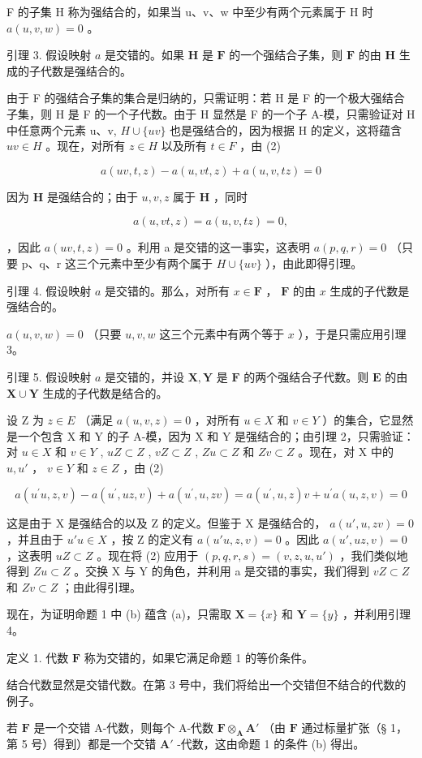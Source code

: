 F 的子集 H 称为强结合的，如果当 u、v、w 中至少有两个元素属于 H 时 \(a(u, v, w) = 0\) 。

引理 3. 假设映射 \(a\) 是交错的。如果 \(\mathbf{H}\) 是 \(\mathbf{F}\) 的一个强结合子集，则 \(\mathbf{F}\) 的由 \(\mathbf{H}\) 生成的子代数是强结合的。

由于 F 的强结合子集的集合是归纳的，只需证明：若 H 是 F 的一个极大强结合子集，则 H 是 F 的一个子代数。由于 H 显然是 F 的一个子 A-模，只需验证对 H 中任意两个元素 u、v, \(H \cup \{uv\}\) 也是强结合的，因为根据 H 的定义，这将蕴含 \(uv \in H\) 。现在，对所有 \(z \in H\) 以及所有 \(t \in F\) ，由 (2)

\[
a (u v, t, z) - a (u, v t, z) + a (u, v, t z) = 0
\]

因为 \(\mathbf{H}\) 是强结合的；由于 \(u, v, z\) 属于 \(\mathbf{H}\) ，同时

\[
a (u, v t, z) = a (u, v, t z) = 0,
\]

，因此 \(a(uv, t, z) = 0\) 。利用 a 是交错的这一事实，这表明 \(a(p, q, r) = 0\) （只要 p、q、r 这三个元素中至少有两个属于 \(H \cup \{uv\}\) ），由此即得引理。

引理 4. 假设映射 \(a\) 是交错的。那么，对所有 \(x \in \mathbf{F}\) ， \(\mathbf{F}\) 的由 \(x\) 生成的子代数是强结合的。

\(a(u,v,w) = 0\) （只要 \(u, v, w\) 这三个元素中有两个等于 \(x\) ），于是只需应用引理 3。

引理 5. 假设映射 \(a\) 是交错的，并设 \(\mathbf{X}, \mathbf{Y}\) 是 \(\mathbf{F}\) 的两个强结合子代数。则 \(\mathbf{E}\) 的由 \(\mathbf{X} \cup \mathbf{Y}\) 生成的子代数是结合的。

设 Z 为 \(z \in E\) （满足 \(a(u, v, z) = 0\) ，对所有 \(u \in X\) 和 \(v \in Y\) ）的集合，它显然是一个包含 X 和 Y 的子 A-模，因为 X 和 Y 是强结合的；由引理 2，只需验证：对 \(u \in X\) 和 \(v \in Y\) , \(uZ \subset Z\) , \(vZ \subset Z\) , \(Zu \subset Z\) 和 \(Zv \subset Z\) 。现在，对 X 中的 \(u, u'\) ， \(v \in Y\) 和 \(z \in Z\) ，由 (2)

\[
a (u ^ {\prime} u, z, v) - a (u ^ {\prime}, u z, v) + a (u ^ {\prime}, u, z v) = a (u ^ {\prime}, u, z) v + u ^ {\prime} a (u, z, v) = 0
\]

这是由于 X 是强结合的以及 Z 的定义。但鉴于 X 是强结合的， \(a(u', u, zv) = 0\) ，并且由于 \(u'u \in X\) ，按 Z 的定义有 \(a(u'u, z, v) = 0\) 。因此 \(a(u', uz, v) = 0\) ，这表明 \(uZ \subset Z\) 。现在将 (2) 应用于 \((p, q, r, s) = (v, z, u, u')\) ，我们类似地得到 \(Zu \subset Z\) 。交换 X 与 Y 的角色，并利用 a 是交错的事实，我们得到 \(vZ \subset Z\) 和 \(Zv \subset Z\) ；由此得引理。

现在，为证明命题 1 中 (b) 蕴含 (a)，只需取 \(\mathbf{X} = \{x\}\) 和 \(\mathbf{Y} = \{y\}\) ，并利用引理 4。

定义 1. 代数 \(\mathbf{F}\) 称为交错的，如果它满足命题 1 的等价条件。

结合代数显然是交错代数。在第 3 号中，我们将给出一个交错但不结合的代数的例子。

若 \(\mathbf{F}\) 是一个交错 A-代数，则每个 A-代数 \(\mathbf{F} \otimes_{\mathbf{A}} \mathbf{A}'\) （由 \(\mathbf{F}\) 通过标量扩张（§ 1，第 5 号）得到）都是一个交错 \(\mathbf{A}'\) -代数，这由命题 1 的条件 (b) 得出。

